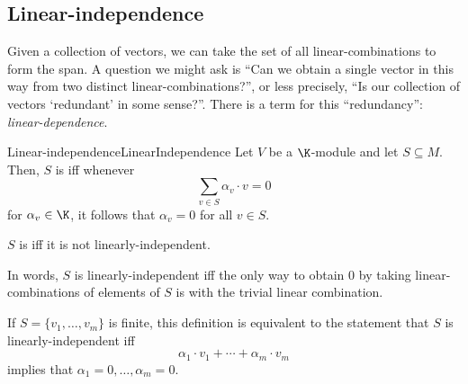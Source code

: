 \subsection{Linear-independence}

Given a collection of vectors, we can take the set of all linear-combinations to form the span.  A question we might ask is ``Can we obtain a single vector in this way from two distinct linear-combinations?'', or less precisely, ``Is our collection of vectors `redundant' in some sense?''.  There is a term for this ``redundancy'':  \emph{linear-dependence}.
\begin{dfn}{Linear-independence}{LinearIndependence}
	Let $V$ be a $\K$-module and let $S\subseteq M$.  Then, $S$ is  iff whenever
	\begin{equation}
		\sum _{v\in S}\alpha _v\cdot v=0
	\end{equation}
	for $\alpha _v\in \K$, it follows that $\alpha _v=0$ for all $v\in S$.
	
	$S$ is  iff it is not linearly-independent.
	\begin{rmk}
		In words, $S$ is linearly-independent iff the only way to obtain $0$ by taking linear-combinations of elements of $S$ is with the trivial linear combination.
	\end{rmk}
	\begin{rmk}
		If $S=\{ v_1,\ldots ,v_m\}$ is finite, this definition is equivalent to the statement that $S$ is linearly-independent iff
		\begin{equation}
			\alpha _1\cdot v_1+\cdots +\alpha _m\cdot v_m
		\end{equation}
		implies that $\alpha _1=0,\ldots ,\alpha _m=0$.
		

\end{rmk}
\end{dfn}
